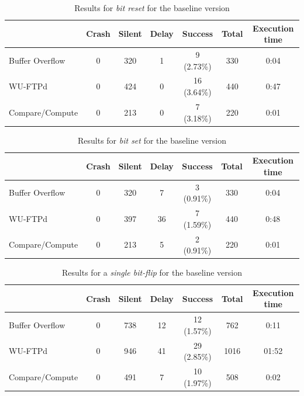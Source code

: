 \begin{table}[t]
    \centering
    \footnotesize
    \caption{Results for \textit{bit reset} for the baseline version}
    \label{table:end_sim_by_status_wop_1_set0}
    \begin{tabular}{@{}lcccccc@{}}
        \toprule
                        & Crash & Silent & Delay & Success     & Total & Execution time \\
        \midrule
        Buffer Overflow & 0     & 320    & 1     & 9 (2.73\%)  & 330   & 0:04           \\
        WU-FTPd         & 0     & 424    & 0     & 16 (3.64\%) & 440   & 0:47           \\
        Compare/Compute & 0     & 213    & 0     & 7 (3.18\%)  & 220   & 0:01           \\
        \bottomrule
    \end{tabular}
\end{table}

\begin{table}[t]
    \centering
    \footnotesize
    \caption{Results for \textit{bit set} for the baseline version}
    \label{table:end_sim_by_status_wop_1_set1}
    \begin{tabular}{@{}lcccccc@{}}
        \toprule
                        & Crash & Silent & Delay & Success    & Total & Execution time \\
        \midrule
        Buffer Overflow & 0     & 320    & 7     & 3 (0.91\%) & 330   & 0:04           \\
        WU-FTPd         & 0     & 397    & 36    & 7 (1.59\%) & 440   & 0:48           \\
        Compare/Compute & 0     & 213    & 5     & 2 (0.91\%) & 220   & 0:01           \\
        \bottomrule
    \end{tabular}
\end{table}

\begin{table}[t]
    \centering
    \footnotesize
    \caption{Results for a \textit{single bit-flip} for the baseline version}
    \label{table:end_sim_by_status_wop_1_bitflip}
    \begin{tabular}{@{}lcccccc@{}}
        \toprule
                        & Crash & Silent & Delay & Success     & Total & Execution time \\
        \midrule
        Buffer Overflow & 0     & 738    & 12    & 12 (1.57\%) & 762   & 0:11           \\
        WU-FTPd         & 0     & 946    & 41    & 29 (2.85\%) & 1016  & 01:52          \\
        Compare/Compute & 0     & 491    & 7     & 10 (1.97\%) & 508   & 0:02           \\
        \bottomrule
    \end{tabular}
\end{table}

